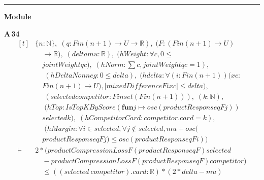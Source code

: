 \vspace{4pt}\noindent\rule{\columnwidth}{0.4pt}\par\vspace{2pt}
\noindent\textbf{Module }\par\vspace{3pt}

\noindent\textbf{A\,34}\quad{}
{\footnotesize\[ \begin{aligned}[t]
&\{ \mathit{n} : \mathbb{N} \},\; (\mathit{q} : \mathit{Fin} (\mathit{n} + 1) \to \mathit{U} \to \mathbb{R} ),\; (\mathit{F} : (\mathit{Fin} (\mathit{n} + 1) \to \mathit{U})\\
&\quad \to \mathbb{R} ),\; (\mathit{delta} \mathit{mu} : \mathbb{R} ),\; (\mathit{hWeight} : \forall \mathit{c}, 0 \leq\\
&\quad \mathit{jointWeight} \mathit{q} \mathit{c}),\; (\mathit{hNorm} : \textstyle\sum \mathit{c}, \mathit{jointWeight} \mathit{q} \mathit{c} = 1),\\
&\quad \; (\mathit{hDeltaNonneg} : 0 \leq \mathit{delta}),\; (\mathit{hdelta} : \forall (\mathit{i} : \mathit{Fin} (\mathit{n} + 1)) (\mathit{x} \mathit{c} :\\
&\quad \mathit{Fin} (\mathit{n} + 1) \to \mathit{U}), |\mathit{mixedDifference} \mathit{F} \mathit{i} \mathit{x} \mathit{c}| \leq \mathit{delta}),\\
&\quad \; (\mathit{selected} \mathit{competitor} : \mathit{Finset} (\mathit{Fin} (\mathit{n} + 1))),\; (\mathit{k} : \mathbb{N} ),\\
&\quad \; (\mathit{hTop} : \mathit{IsTopKByScore} (\mathbf{fun} \mathit{j} \mapsto \mathit{osc} (\mathit{productResponse} \mathit{q} \mathit{F} \mathit{j}))\\
&\quad \mathit{selected} \mathit{k}),\; (\mathit{hCompetitorCard} : \mathit{competitor}.\mathit{card} = \mathit{k}),\\
&\quad \; (\mathit{hMargin} : \forall \mathit{i} \in \mathit{selected}, \forall \mathit{j} \notin \mathit{selected}, \mathit{mu} + \mathit{osc} (\\
&\quad \mathit{productResponse} \mathit{q} \mathit{F} \mathit{j}) \leq \mathit{osc} (\mathit{productResponse} \mathit{q} \mathit{F} \mathit{i}))\\
\vdash\;&2 * (\mathit{productCompressionLoss} \mathit{F} (\mathit{productResponse} \mathit{q} \mathit{F}) \mathit{selected}\\
&\quad - \mathit{productCompressionLoss} \mathit{F} (\mathit{productResponse} \mathit{q} \mathit{F}) \mathit{competitor})\\
&\quad \leq ((\mathit{selected} \ \mathit{competitor}).\mathit{card} : \mathbb{R} ) * (2 * \mathit{delta} - \mathit{mu})
\end{aligned} \]}

